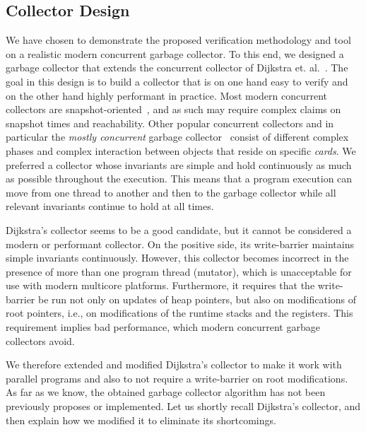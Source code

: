 \subsection{Collector Design}
We have chosen to demonstrate the proposed verification methodology and tool on a realistic modern concurrent garbage collector. To this end, we designed a garbage collector that extends the concurrent collector of Dijkstra et. al.~\cite{dijk78}. The goal in this design is to build a collector that is on one hand easy to verify and on the other hand highly performant in practice. Most modern concurrent collectors are snapshot-oriented~\cite{doli93,doli94,doma00,azat03}, and as such may require complex claims on snapshot times and reachability. Other popular concurrent collectors and in particular the {\em mostly concurrent} garbage collector~\cite{boeh91,prin00a,bara05} consist of different complex phases and complex interaction between objects that reside on specific {\em cards}. We preferred a collector whose invariants are simple and hold continuously as much as possible throughout the execution. This means that a program execution can move from one thread to another and then to the garbage collector while all relevant invariants continue to hold at all times. 

Dijkstra's collector seems to be a good candidate, but it cannot be considered a modern or performant collector. On the positive side, its write-barrier maintains simple invariants continuously. However, this collector becomes incorrect in the presence of more than one program thread (mutator), which is unacceptable for use with modern multicore platforms. Furthermore, it requires that the write-barrier be run not only on updates of heap pointers, but also on modifications of root pointers, i.e., on modifications of the runtime stacks and the registers. This requirement implies bad performance, which modern concurrent garbage collectors avoid. 

We therefore extended and modified Dijkstra's collector to make it work with parallel programs and also to not require a write-barrier on root modifications. As far as we know, the obtained garbage collector algorithm has not been previously proposes or implemented. Let us shortly recall Dijkstra's collector, and then explain how we modified it to eliminate its shortcomings.  

